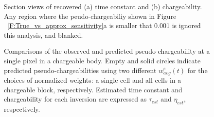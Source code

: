 \documentclass[extra,mreferee]{gji}
\begin{document}
\begin{figure}
  \caption{Section views of recovered (a) time constant and (b) chargeability. Any region where the peudo-chargeabiliy shown in Figure ~\ref{F:True_vs_approx_sensitivity}a is smaller that 0.001 is ignored this analysis, and blanked.}
  \label{F:EtaTauSection}
\end{figure}

\begin{figure}
  \caption{Comparisons of the observed and predicted pseudo-chargeability at a single pixel in a chargeable body. 
  Empty and solid circles indicate predicted pseudo-chargeabilities using two different $w^e_{avg}(t)$ for the choices of normalized weights: a single cell and all cells in a chargeable block, respectively. Estimated time constant and chargeability for each inversion are expressed as $\tau_{est}$ and $\eta_{est}$, respectively.}
  \label{F:IntrinsicIP}
\end{figure}
\clearpage
\end{document}
